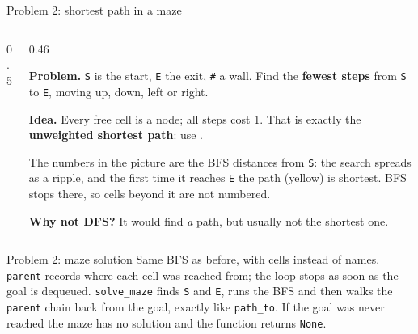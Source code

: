 \documentclass[aspectratio=169,10pt]{beamer}
\begin{document}
\begin{frame}{Problem 2: shortest path in a maze}
\begin{columns}[T]
\begin{column}{0.5\textwidth}
\begin{sfig}[0.55]
\begin{tikzpicture}
  
\end{tikzpicture}
\end{sfig}
\vspace{1mm}
\end{column}
\begin{column}{0.46\textwidth}
{\small
\textbf{Problem.} \texttt{S} is the start, \texttt{E} the exit, \texttt{\#} a wall. Find the \textbf{fewest steps} from \texttt{S} to \texttt{E}, moving up, down, left or right.

\vspace{2mm}
\textbf{Idea.} Every free cell is a node; all steps cost 1. That is exactly the \textbf{unweighted shortest path}: use .

\vspace{2mm}
The numbers in the picture are the BFS distances from \texttt{S}: the search spreads as a ripple, and the first time it reaches \texttt{E} the path (yellow) is shortest. BFS stops there, so cells beyond it are not numbered.

\vspace{2mm}
\textbf{Why not DFS?} It would find \emph{a} path, but usually not the shortest one.}
\end{column}
\end{columns}
\end{frame}

\begin{frame}[allowframebreaks]{Problem 2: maze solution}
\vspace{2mm}
{\small
Same BFS as before, with cells instead of names. \texttt{parent} records where each cell was reached from; the loop stops as soon as the goal is dequeued.}
\framebreak
{}
\vspace{2mm}
{\small
\texttt{solve\_maze} finds \texttt{S} and \texttt{E}, runs the BFS and then walks the \texttt{parent} chain back from the goal, exactly like \texttt{path\_to}. If the goal was never reached the maze has no solution and the function returns \texttt{None}.}
\end{frame}
\end{document}
